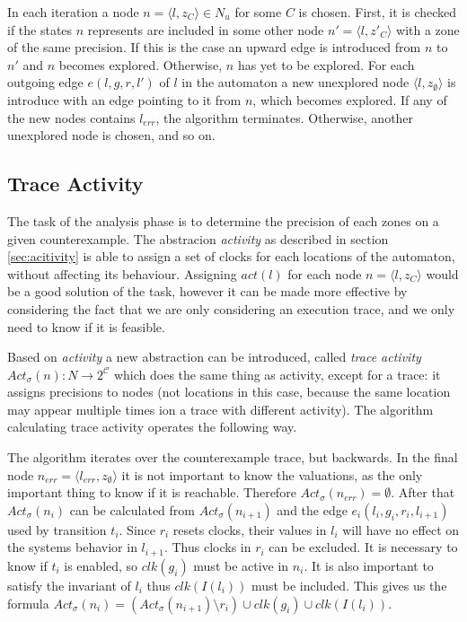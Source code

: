 In each iteration a node $n=\langle l, z_{C} \rangle \in N_u$ for some $C$ is chosen. First, it is checked if the states $n$ represents are included in some other node $n'=\langle l, z'_{C} \rangle$ with a zone of the same precision. If this is the case an upward edge is introduced from $n$ to $n'$ and $n$ becomes explored. Otherwise, $n$ has yet to be explored. For each outgoing edge $e(l,g,r,l')$ of $l$ in the automaton a new unexplored node $\langle l, z_{\emptyset} \rangle$ is introduce with an edge pointing to it from $n$, which becomes explored. If any of the new nodes contains $l_{err}$, the algorithm terminates. Otherwise, another unexplored node is chosen, and so on.



\subsection{Trace Activity}

The task of the analysis phase is to determine the precision of each zones on a given counterexample. The abstracion \emph{activity} as described in section \ref{sec:acitivity} is able to assign a set of clocks for each locations of the automaton, without affecting its behaviour. Assigning $act(l)$ for each node $n=\langle l, z_{C} \rangle$ would be a good solution of the task, however it can be made more effective by considering the fact that we are only considering an execution trace, and we only need to know if it is feasible.

Based on \emph{activity} a new abstraction can be introduced, called \emph{trace activity} $Act_\sigma(n): N \to 2^\mathcal{C}$ which does the same thing as activity, except for a trace: it assigns precisions to nodes (not locations in this case, because the same location may appear multiple times ion a trace with different activity). The algorithm calculating trace activity operates the following way.

The algorithm iterates over the counterexample trace, but backwards. In the final node  $n_{err}=\langle l_{err}, z_{\emptyset} \rangle$ it is not important to know the valuations, as the only important thing to know if it is reachable. Therefore $Act_\sigma(n_{err})=\emptyset$. After that $Act_\sigma(n_i)$ can be calculated from $Act_\sigma(n_{i+1})$ and the edge $e_i(l_i,g_i,r_i,l_{i+1})$ used by transition $t_i$. Since $r_i$ resets clocks, their values in $l_i$ will have no effect on the systems behavior in $l_{i+1}$. Thus clocks in $r_i$ can be excluded. It is necessary to know if $t_i$ is enabled, so $clk(g_i)$ must be active in $n_i$. It is also important to satisfy the invariant of $l_i$ thus $clk(I(l_i))$ must be included. This gives us the formula $Act_\sigma(n_i)=(Act_\sigma(n_{i+1}) \setminus r_i) \cup clk(g_i) \cup clk(I(l_i))$. 

